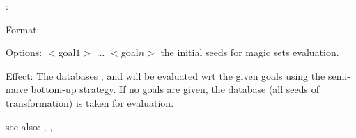 :

Format: 

Options: $<$goal$1>$ ... $<$goal$n>$ the initial seeds for magic sets evaluation.

Effect: The databases ,  and  will be 
	evaluated wrt the given goals using the semi-naive bottom-up strategy. 
	If no goals are given, the database  (all seeds of 
        transformation) is taken for evaluation.   

see also: \eval, , 

